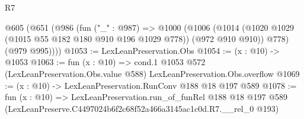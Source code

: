\begin{lexlean}{R7}
\begin{coremodule}
  @605
    (@651
      (@986
        (fun ("_" : @987) =>
        @1000
          (@1006
            (@1014 (@1020 @1029 (@1015 @55 @182 @180 @910 @196 @1029 @778)) (@972 @910 @910))
            @778)
          (@979 @995))))
@1053 := LexLeanPreservation.Obs
@1054 := (x : @10) -> @1053
@1063 := fun (x : @10) =>
  cond.{1} @1053 @572 (LexLeanPreservation.Obs.value @588) LexLeanPreservation.Obs.overflow
@1069 := (x : @10) -> LexLeanPreservation.RunConv @188 @18 @197 @589
@1078 := fun (x : @10) =>
  LexLeanPreservation.run_of_funRel
    @188
    @18
    @197
    @589
    (LexLeanPreserve.C4497024b6f2c68f52a466a3145ac1c0d.R7.__rel_0 @193)
\end{coremodule}
\end{lexlean}

